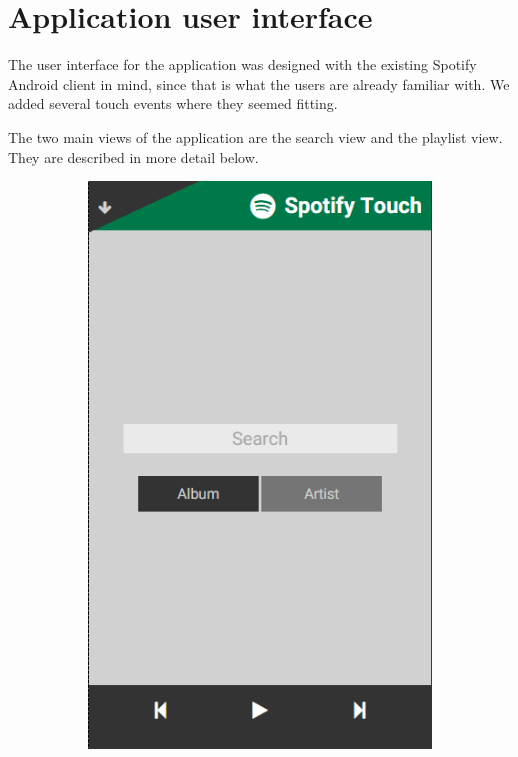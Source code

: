 \documentclass[conference]{IEEEtran}
\begin{document}
\section{Application user interface}
The user interface for the application was designed with the existing Spotify Android client in mind,
since that is what the users are already familiar with.
We added several touch events where they seemed fitting.

The two main views of the application are the search view and the playlist view.
They are described in more detail below.

\begin{figure}[htbp]
    \centering
    \begin{subfigure}{0.45\columnwidth}
        \centering
        \includegraphics[width=0.9\linewidth]{spotify_search.png}

\end{subfigure}
\end{figure}
\end{document}
